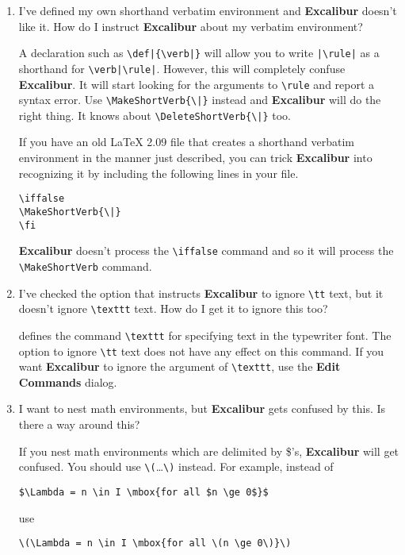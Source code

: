 \documentclass[11pt,titlepage]{article}
\newcommand{\ex}{\textbf{Excalibur}}
\begin{document}
\begin{enumerate}
  If you are using version 2.3 or later, \ex{} will do a much better
  job of suggesting words if your dictionary has words stored using
  Apple's extended character set.

\item I've defined my own shorthand verbatim environment and \ex{} doesn't
  like it.  How do I instruct \ex{} about my verbatim environment?

  A declaration such as \verb+\def|{\verb|}+ will allow you to write
  \verb+|\rule|+ as a shorthand for \verb+\verb|\rule|+.  However,
  this will completely confuse \ex.  It will start looking for the
  arguments to \verb+\rule+ and report a syntax error.  Use
  \verb+\MakeShortVerb{\|}+ instead and \ex{} will do the right thing.
  It knows about \verb+\DeleteShortVerb{\|}+ too.

  If you have an old \LaTeX{} 2.09 file that creates a shorthand
  verbatim environment in the manner just described, you can trick
  \ex{} into recognizing it by including the following lines in your
  file.
\begin{verbatim}
\iffalse
\MakeShortVerb{\|}
\fi
\end{verbatim}
  \ex{} doesn't process the \verb+\iffalse+ command and so it will
  process the \verb+\MakeShortVerb+ command.

\item I've checked the option that instructs \ex{} to ignore
  \verb+\tt+ text, but it doesn't ignore \verb+\texttt+ text.  How do
  I get it to ignore this too?

  \LaTeXe{} defines the command \verb+\texttt+ for specifying text in
  the typewriter font.  The option to ignore \verb+\tt+ text does not
  have any effect on this command.  If you want \ex{} to ignore the
  argument of \verb+\texttt+, use the \textbf{Edit Commands} dialog.

\item I want to nest math environments, but \ex{} gets confused by
  this.  Is there a way around this?

  If you nest math environments which are delimited by \$'s, \ex{}
  will get confused.  You should use \verb+\(+\ldots\verb+\)+ instead.
  For example, instead of
\begin{verbatim}
$\Lambda = n \in I \mbox{for all $n \ge 0$}$
\end{verbatim}
use
\begin{verbatim}
\(\Lambda = n \in I \mbox{for all \(n \ge 0\)}\)
\end{verbatim}


\end{enumerate}
\end{document}
